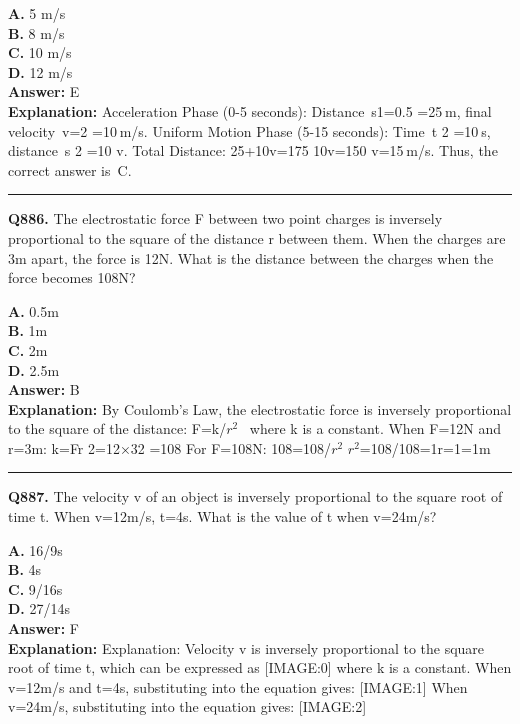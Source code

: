 \documentclass[12pt]{article}
\begin{document}
\textbf{A.} 5 m/s \\
\textbf{B.} 8 m/s \\
\textbf{C.} 10 m/s \\
\textbf{D.} 12 m/s \\

\textbf{Answer:} E \\
\textbf{Explanation:} Acceleration Phase (0-5 seconds):
Distance s1=0.5
=25 m, final velocity v=2
=10 m/s.
Uniform Motion Phase (5-15 seconds):
Time t
2
=10 s, distance s
2
=10
\cdot 
v.
Total Distance:
25+10v=175
\implies 
10v=150
\implies 
v=15 m/s.
Thus, the correct answer is C.

\hrule
\vspace{1em}


\noindent
\textbf{Q886.} The electrostatic force F between two point charges is inversely proportional to the square of the distance r between them. When the charges are 3m apart, the force is 12N. What is the distance between the charges when the force becomes 108N?



\textbf{A.} 0.5m \\
\textbf{B.} 1m \\
\textbf{C.} 2m \\
\textbf{D.} 2.5m \\

\textbf{Answer:} B \\
\textbf{Explanation:} By Coulomb's Law, the electrostatic force is inversely proportional to the square of the distance: F=k/$r^2$  where k is a constant. When F=12N and r=3m: k=F\cdot r 2=12×32 =108 For F=108N: 108=108/$r^2$ \implies $r^2$=108/108=1\implies r=\sqrt{}1=1m

\hrule
\vspace{1em}


\noindent
\textbf{Q887.} The velocity v of an object is inversely proportional to the square root of time t. When v=12m/s, t=4s. What is the value of t when v=24m/s?



\textbf{A.} 16/9s \\
\textbf{B.} 4s \\
\textbf{C.} 9/16s \\
\textbf{D.} 27/14s \\

\textbf{Answer:} F \\
\textbf{Explanation:} Explanation: Velocity v is inversely proportional to the square root of time t, which can be expressed as
[IMAGE:0]
where k is a constant. When v=12m/s and t=4s, substituting into the equation gives:
[IMAGE:1]
When v=24m/s, substituting into the equation gives:
[IMAGE:2]
\end{document}
